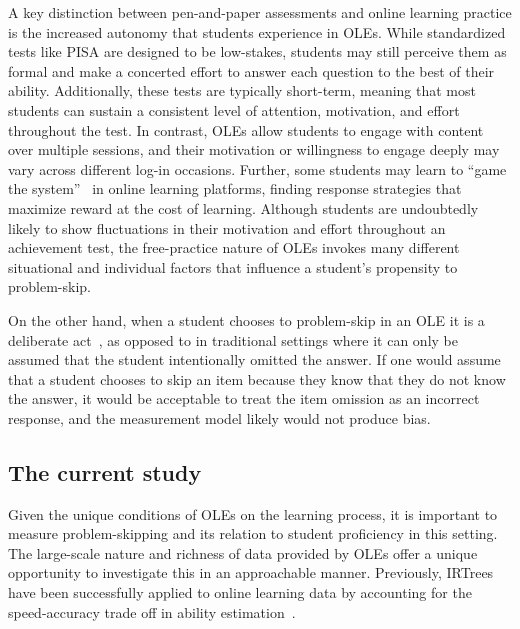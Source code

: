 \documentclass[manuscript]{acmart}
\begin{document}
A key distinction between pen-and-paper assessments and online learning practice is the increased autonomy that students experience in OLEs. While standardized tests like PISA are designed to be low-stakes, students may still perceive them as formal and make a concerted effort to answer each question to the best of their ability. Additionally, these tests are typically short-term, meaning that most students can sustain a consistent level of attention, motivation, and effort throughout the test. In contrast, OLEs allow students to engage with content over multiple sessions, and their motivation or willingness to engage deeply may vary across different log-in occasions. Further, some students may learn to ``game the system''~\cite{baker2004off} in online learning platforms, finding response strategies that maximize reward at the cost of learning. Although students are undoubtedly likely to show fluctuations in their motivation and effort throughout an achievement test, the free-practice nature of OLEs invokes many different situational and individual factors that influence a student's propensity to problem-skip. 

On the other hand, when a student chooses to problem-skip in an OLE it is a deliberate act~\cite{savi2018delaying, savi2023combating}, as opposed to in traditional settings where it can only be assumed that the student intentionally omitted the answer. If one would assume that a student chooses to skip an item because they know that they do not know the answer, it would be acceptable to treat the item omission as an incorrect response, and the measurement model likely would not produce bias. 


\subsection{The current study}
Given the unique conditions of OLEs on the learning process, it is important to measure problem-skipping and its relation to student proficiency in this setting. The large-scale nature and richness of data provided by OLEs offer a unique opportunity to investigate this in an approachable manner. Previously, IRTrees have been successfully applied to online learning data by accounting for the speed-accuracy trade off in ability estimation~\cite{coomans2016distinguishing}. 
\end{document}
